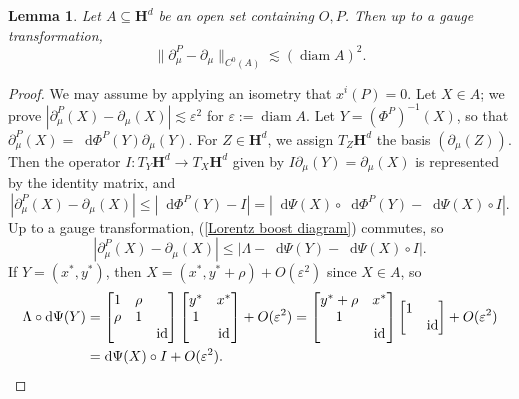 \documentclass[reqno,11pt]{amsart}
\newcommand{\Hyp}{\mathbf H}
\DeclareMathOperator{\diam}{diam}
\DeclareMathOperator{\id}{id}
\newcommand*\dif{\mathop{}\!\mathrm{d}}
\newtheorem{lemma}[theorem]{Lemma}
\theoremstyle{definition}
\numberwithin{equation}{section}
\begin{document}
\begin{lemma}\label{DoVF lemma}
Let $A \subseteq \Hyp^d$ be an open set containing $O, P$.
Then up to a gauge transformation,
\begin{equation}\label{difference of vector fields}
\|\partial^P_\mu - \partial_\mu\|_{C^0(A)} \lesssim (\diam A)^2.
\end{equation}
\end{lemma}
\begin{proof}
We may assume by applying an isometry that $x^i(P) = 0$.
Let $X \in A$; we prove $|\partial^P_\mu(X) - \partial_\mu(X)| \lesssim \varepsilon^2$ for $\varepsilon := \diam A$.
Let $Y = (\Phi^P)^{-1}(X)$, so that $\partial^P_\mu(X) = \dif \Phi^P(Y) \partial_\mu(Y)$.
For $Z \in \Hyp^d$, we assign $T_Z \Hyp^d$ the basis $(\partial_\mu(Z))$.
Then the operator $I: T_Y \Hyp^d \to T_X \Hyp^d$ given by $I \partial_\mu(Y) = \partial_\mu(X)$ is represented by the identity matrix, and
$$|\partial^P_\mu(X) - \partial_\mu(X)| \leq |\dif \Phi^P(Y) - I| = |\dif \Psi(X) \circ \dif \Phi^P(Y) - \dif \Psi(X) \circ I|.$$
Up to a gauge transformation, (\ref{Lorentz boost diagram}) commutes, so
$$|\partial^P_\mu(X) - \partial_\mu(X)| \leq |\Lambda - \dif \Psi(Y) - \dif \Psi(X) \circ I|.$$
If $Y = (x^*, y^*)$, then $X = (x^*, y^* + \rho) + O(\varepsilon^2)$ \cite[(4.5.5)]{ratcliffe2006foundations} since $X \in A$, so
\begin{align*}
\Lambda \circ \dif \Psi(Y) &= \begin{bmatrix}1 & \rho \\ \rho & 1 \\ && \id \end{bmatrix} \begin{bmatrix}y^* & x^* \\ 1 \\ & \id \end{bmatrix} + O(\varepsilon^2) = \begin{bmatrix}y^* + \rho & x^* \\ 1 \\ & \id\end{bmatrix} \begin{bmatrix}1 \\ & \id\end{bmatrix} + O(\varepsilon^2) \\
&= \dif \Psi(X) \circ I + O(\varepsilon^2). \qedhere
\end{align*}
\end{proof}
\end{document}
